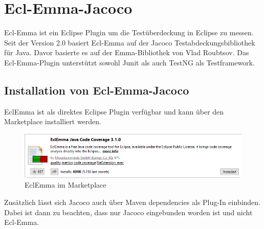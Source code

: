 \documentclass[a4paper]{article}
\author{Mario Groneick, Marcel Brockskothen}
\begin{document}

\tableofcontents
\section{Ecl-Emma-Jacoco}
Ecl-Emma ist ein Eclipse Plugin um die Testüberdeckung in Eclipse zu messen.
Seit der Version 2.0 basiert Ecl-Emma auf der Jacoco Testabdeckungsbibliothek für Java.
Davor basierte es auf der Emma-Bibliothek von Vlad Roubtsov. Das Ecl-Emma-Plugin unterstützt
sowohl Junit als auch TestNG als Testframework.
\subsection{Installation von Ecl-Emma-Jacoco}
EclEmma ist als direktes Eclipse Plugin verfügbar und kann über den Marketplace installiert werden. 
\begin{figure}[h]
\includegraphics[scale=0.5]{EclEmma_Marketplace.png}
\caption{EclEmma im Marketplace}
\centering
\end{figure}
Zusätzlich lässt sich Jacoco auch über Maven dependencies als Plug-In einbinden. Dabei ist dann zu beachten, dass nur Jacoco eingebunden worden ist und nicht Ecl-Emma. 
\end{document}
